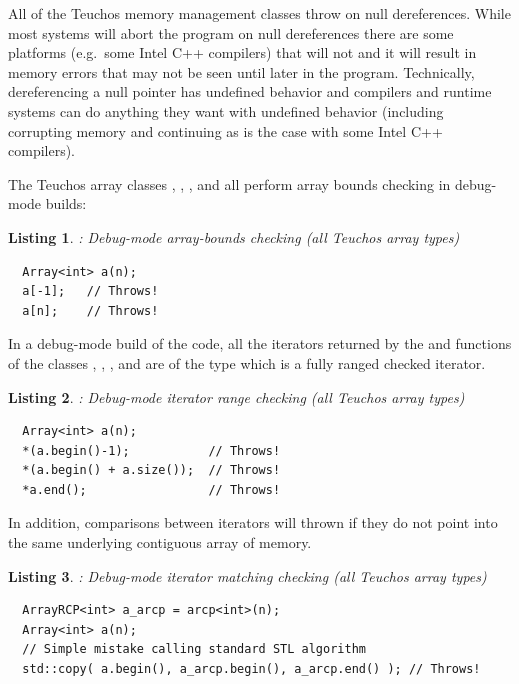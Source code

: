 \documentclass[pdf,ps2pdf,11pt]{SANDreport}
\newtheorem{listing}{Listing}
\begin{document}
All of the Teuchos memory management classes throw on null
dereferences.  While most systems will abort the program on null
dereferences there are some platforms (e.g.\ some Intel C++ compilers)
that will not and it will result in memory errors that may not be seen
until later in the program.  Technically, dereferencing a null pointer
has undefined behavior and compilers and runtime systems can do
anything they want with undefined behavior (including corrupting
memory and continuing as is the case with some Intel C++ compilers).

The Teuchos array classes {}, {},
{}, and {} all perform array bounds
checking in debug-mode builds:

\begin{listing}: Debug-mode array-bounds checking (all Teuchos array types) \\
\label{listing:array-bounds-checking}
{\small\begin{verbatim}
  Array<int> a(n);
  a[-1];   // Throws!
  a[n];    // Throws!
\end{verbatim}}
\end{listing}

In a debug-mode build of the code, all the iterators returned by the
{} and {} functions of the classes
{}, {}, {}, and
{} are of the type {} which is a fully
ranged checked iterator.


{}\begin{listing}: Debug-mode iterator range checking (all Teuchos
array types)
\label{listing:iterator-checking}
{\small\begin{verbatim}
  Array<int> a(n);
  *(a.begin()-1);           // Throws!
  *(a.begin() + a.size());  // Throws!
  *a.end();                 // Throws!
\end{verbatim}}
\end{listing}


In addition, comparisons between iterators will thrown if they do not
point into the same underlying contiguous array of memory.


{}\begin{listing}: Debug-mode iterator matching checking (all Teuchos
array types)
\label{listing:iterator-matching-checking}
{\small\begin{verbatim}
  ArrayRCP<int> a_arcp = arcp<int>(n);
  Array<int> a(n);
  // Simple mistake calling standard STL algorithm
  std::copy( a.begin(), a_arcp.begin(), a_arcp.end() ); // Throws!
\end{verbatim}}
\end{listing}
\end{document}
